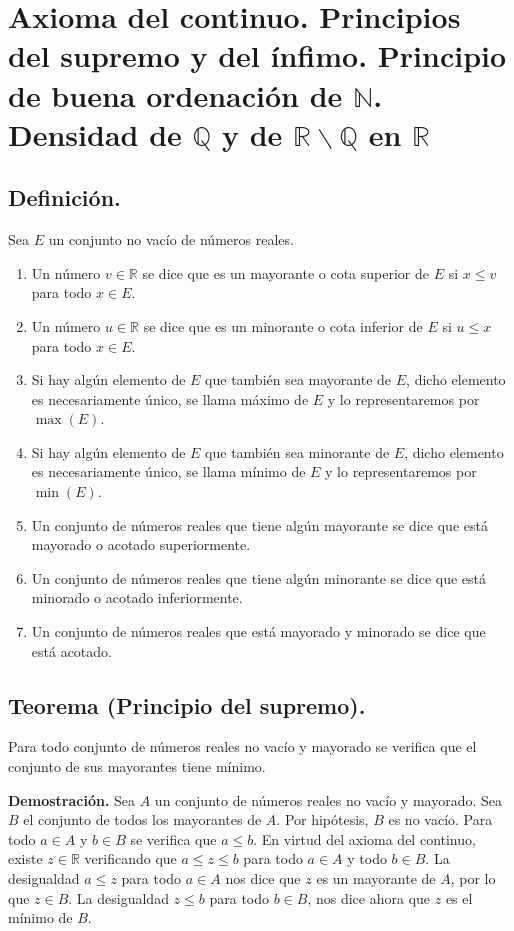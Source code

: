 \documentclass[10pt,a4paper]{article}
\begin{document}
	\justify 
	
	\section{Axioma del continuo. Principios del supremo y del ínfimo. Principio de buena ordenación de $\mathbb{N}$. Densidad de $\mathbb{Q}$ y de $\mathbb{R} \backslash \mathbb{Q}$ en $ \mathbb{R}$}
	
		\subsection{Definición.}
		
		Sea $E$ un conjunto no vacío de números reales. 
		\begin{enumerate}[label=\roman*)]
			\item Un número $v \in \mathbb{R}$ se dice que es un mayorante o cota superior de $E$ si $x \leq v$ para todo $x \in E$.
			\item Un número $u \in \mathbb{R}$ se dice que es un minorante o cota inferior de $E$ si $u \leq x$ para todo $x \in E$.
			\item Si hay algún elemento de $E$ que también sea mayorante de $E$, dicho elemento es necesariamente único, se llama máximo de $E$ y lo representaremos por $\max(E)$.
			\item Si hay algún elemento de $E$ que también sea minorante de $E$, dicho elemento es necesariamente único, se llama mínimo de $E$ y lo representaremos por $\min(E)$.
			\item Un conjunto de números reales que tiene algún mayorante se dice que está mayorado o acotado
			superiormente.
			\item  Un conjunto de números reales que tiene algún minorante se dice que está minorado o acotado
			inferiormente.
			\item Un conjunto de números reales que está mayorado y minorado se dice que está acotado.
		\end{enumerate}
		
		\subsection{Teorema (Principio del supremo).} 

		Para todo conjunto de números reales no vacío y mayorado se verifica que el conjunto de sus mayorantes tiene mínimo.
		
		\textbf{Demostración.} Sea $A$ un conjunto de números reales no vacío y mayorado. Sea $B$ el conjunto de todos los mayorantes de $A$. Por hipótesis, $B$ es no vacío. Para todo $a \in A$ y $b \in B$ se verifica que $a \leq b$. En virtud del axioma del continuo, existe $z \in \mathbb{R}$ verificando que $a \leq z \leq b$ para todo $a \in A$ y	todo $b \in B$. La desigualdad $a \leq z$ para todo $a \in A$ nos dice que $z$ es un mayorante de $A$, por lo que	$z \in B$. La desigualdad $z \leq b$ para todo $b \in B$, nos dice ahora que $z$ es el mínimo de $B$.
		
\end{document}
